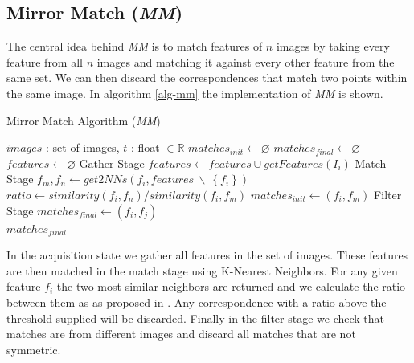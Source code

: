 \documentclass[12pt,journal]{IEEEtran}
\begin{document}
\subsection{Mirror Match (\emph{MM})}
%
The central idea behind \emph{MM} is to match features of $n$ images by 
taking every feature from all $n$ images and matching it against every 
other feature from the same set. We can then discard the correspondences 
that match two points within the same image. In algorithm \ref{alg-mm} 
the implementation of \emph{MM} is shown.
%
\begin{algorithm}
\caption{Mirror Match Algorithm (\emph{MM})}
\label{alg-mm}
{\fontsize{10}{10}\selectfont
\begin{algorithmic}
\Require $images$ : set of images, $t$ : float $\in \mathbb{R}$
\State $matches_{init}\gets \varnothing$
\State $matches_{final}\gets \varnothing$
\State $features\gets \varnothing$
 \Comment Gather Stage
	\State $features\gets features \cup getFeatures(I_i)$
\EndFor
{} \Comment Match Stage
	\State $f_m,f_n \gets get2NNs(f_i, features ~ \backslash ~ 
	\left\{f_i\right\})$
	\State $ratio \gets similarity(f_i, f_n) / similarity(f_i, f_m)$
		\State $matches_{init} \gets \left(f_i, f_m\right)$
	\EndIf
\EndFor
{} \Comment Filter 
Stage
		\State $matches_{final} \gets (f_i, f_j)$
	\EndIf
\EndFor \\
\Return $matches_{final}$
\end{algorithmic}
}
\end{algorithm}
%
In the acquisition state we gather all features in the set of images.  
These features are then matched in the match stage using K-Nearest 
Neighbors.  For any given feature $f_i$ the two most similar neighbors 
are returned and we calculate the ratio between them as as proposed in 
\cite{lowe2004sift}.  Any correspondence with a ratio above the 
threshold supplied will be discarded. Finally in the filter stage we 
check that matches are from different images and discard all matches 
that are not symmetric.
%
\end{document}
